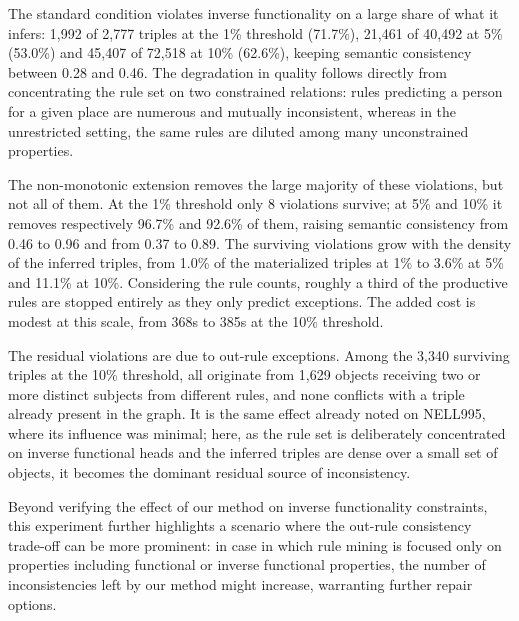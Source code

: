 \documentclass[a4paper,UKenglish,cleveref, autoref, thm-restate]{tgdk-v2021}
\begin{document}
The standard condition violates inverse functionality on a large share of what it infers: 1,992 of 2,777 triples at the 1\% threshold (71.7\%), 21,461 of 40,492 at 5\% (53.0\%) and 45,407 of 72,518 at 10\% (62.6\%), keeping semantic consistency between 0.28 and 0.46. The degradation in quality follows directly from concentrating the rule set on two constrained relations: rules predicting a person for a given place are numerous and mutually inconsistent, whereas in the unrestricted setting, the same rules are diluted among many unconstrained properties.

The non-monotonic extension removes the large majority of these violations, but not all of them. At the 1\% threshold only 8 violations survive; at 5\% and 10\% it removes respectively 96.7\% and 92.6\% of them, raising semantic consistency from 0.46 to 0.96 and from 0.37 to 0.89. The surviving violations grow with the density of the inferred triples, from 1.0\% of the materialized triples at 1\% to 3.6\% at 5\% and 11.1\% at 10\%. Considering the rule counts, roughly a third of the productive rules are stopped entirely as they only predict exceptions. The added cost is modest at this scale, from 368s to 385s at the 10\% threshold.

The residual violations are due to out-rule exceptions. Among the 3,340 surviving triples at the 10\% threshold, all originate from 1,629 objects receiving two or more distinct subjects from different rules, and none conflicts with a triple already present in the graph. It is the same effect already noted on NELL995, where its influence was minimal; here, as the rule set is deliberately concentrated on inverse functional heads and the inferred triples are dense over a small set of objects, it becomes the dominant residual source of inconsistency.

Beyond verifying the effect of our method on inverse functionality constraints, this experiment further highlights a scenario where the out-rule consistency trade-off can be more prominent: in case in which rule mining is focused only on properties including functional or inverse functional properties, the number of inconsistencies left by our method might increase, warranting further repair options.
\end{document}
